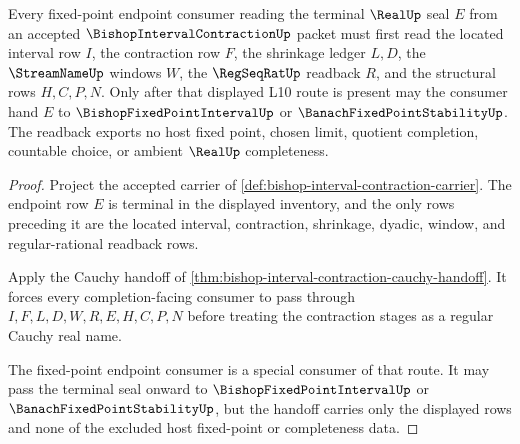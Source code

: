 \begin{theorem}
\label{thm:bishop-interval-contraction-endpoint-readback}
Every fixed-point endpoint consumer reading the terminal $\RealUp$ seal $E$ from an accepted $\BishopIntervalContractionUp$ packet must first read the located interval row $I$, the contraction row $F$, the shrinkage ledger $L,D$, the $\StreamNameUp$ windows $W$, the $\RegSeqRatUp$ readback $R$, and the structural rows $H,C,P,N$. Only after that displayed L10 route is present may the consumer hand $E$ to $\BishopFixedPointIntervalUp$ or $\BanachFixedPointStabilityUp$. The readback exports no host fixed point, chosen limit, quotient completion, countable choice, or ambient $\RealUp$ completeness.
\end{theorem}
\begin{proof}
Project the accepted carrier of \autoref{def:bishop-interval-contraction-carrier}. The endpoint row $E$ is terminal in the displayed inventory, and the only rows preceding it are the located interval, contraction, shrinkage, dyadic, window, and regular-rational readback rows.

Apply the Cauchy handoff of \autoref{thm:bishop-interval-contraction-cauchy-handoff}. It forces every completion-facing consumer to pass through $I,F,L,D,W,R,E,H,C,P,N$ before treating the contraction stages as a regular Cauchy real name.

The fixed-point endpoint consumer is a special consumer of that route. It may pass the terminal seal onward to $\BishopFixedPointIntervalUp$ or $\BanachFixedPointStabilityUp$, but the handoff carries only the displayed rows and none of the excluded host fixed-point or completeness data.
\end{proof}

